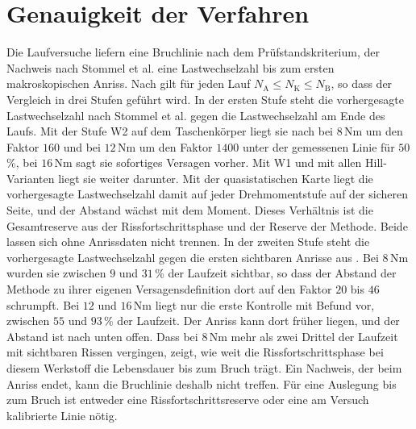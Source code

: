 \section{Genauigkeit der Verfahren}
\label{sec:genauigkeit}

Die Laufversuche liefern eine Bruchlinie nach dem Prüfstandskriterium, der Nachweis nach Stommel et al. eine Lastwechselzahl bis zum ersten makroskopischen Anriss. Nach  gilt für jeden Lauf $N_{\mathrm{A}} \le N_{\mathrm{K}} \le N_{\mathrm{B}}$, so dass der Vergleich in drei Stufen geführt wird. In der ersten Stufe steht die vorhergesagte Lastwechselzahl nach Stommel et al. gegen die Lastwechselzahl am Ende des Laufs. Mit der Stufe W2 auf dem Taschenkörper liegt sie nach  bei $8$\,Nm um den Faktor $160$ und bei $12$\,Nm um den Faktor $1400$ unter der gemessenen Linie für $50$\,\%, bei $16$\,Nm sagt sie sofortiges Versagen vorher. Mit W1 und mit allen Hill-Varianten liegt sie weiter darunter. Mit der quasistatischen Karte liegt die vorhergesagte Lastwechselzahl damit auf jeder Drehmomentstufe auf der sicheren Seite, und der Abstand wächst mit dem Moment. Dieses Verhältnis ist die Gesamtreserve aus der Rissfortschrittsphase und der Reserve der Methode. Beide lassen sich ohne Anrissdaten nicht trennen. In der zweiten Stufe steht die vorhergesagte Lastwechselzahl gegen die ersten sichtbaren Anrisse aus . Bei $8$\,Nm wurden sie zwischen $9$ und $31$\,\% der Laufzeit sichtbar, so dass der Abstand der Methode zu ihrer eigenen Versagensdefinition dort auf den Faktor $20$ bis $46$ schrumpft. Bei $12$ und $16$\,Nm liegt nur die erste Kontrolle mit Befund vor, zwischen $55$ und $93$\,\% der Laufzeit. Der Anriss kann dort früher liegen, und der Abstand ist nach unten offen. Dass bei $8$\,Nm mehr als zwei Drittel der Laufzeit mit sichtbaren Rissen vergingen, zeigt, wie weit die Rissfortschrittsphase bei diesem Werkstoff die Lebensdauer bis zum Bruch trägt. Ein Nachweis, der beim Anriss endet, kann die Bruchlinie deshalb nicht treffen. Für eine Auslegung bis zum Bruch ist entweder eine Rissfortschrittsreserve oder eine am Versuch kalibrierte Linie nötig.

